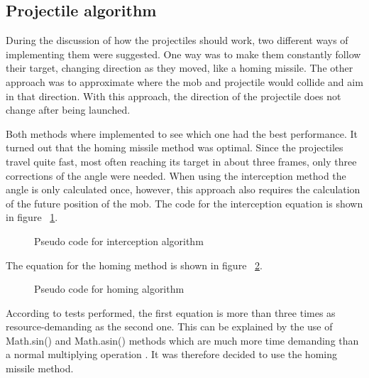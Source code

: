 \subsection{Projectile algorithm}

During the discussion of how the projectiles should work, two different ways of implementing them were suggested. One way was to make them constantly follow their target, changing direction as they moved, like a homing missile. The other approach was to approximate where the mob and projectile would collide and aim in that direction. With this approach, the direction of the projectile does not change after being launched. 

Both methods where implemented to see which one had the best performance. It turned out that the homing missile method was optimal. Since the projectiles travel quite fast, most often reaching its target in about three frames, only three corrections of the angle were needed. When using the interception method the angle is only calculated once, however, this approach also requires the calculation of the future position of the mob. The code for the interception equation is shown in figure ~\ref{fig:codeEXInterception}.

\begin{figure}[htb]

\begin{small}

\end{small}

\caption{Pseudo code for interception algorithm}
\label{fig:codeEXInterception}

\end{figure}

The equation for the homing method is shown in figure ~\ref{fig:codeEXHoming}.

\begin{figure}[htb]

\begin{small}

\end{small}

\caption{Pseudo code for homing algorithm}
\label{fig:codeEXHoming}

\end{figure}

According to tests performed, the first equation is more than three times as resource-demanding as the second one. This can be explained by the use of Math.sin() and Math.asin() methods which are much more time demanding than a normal multiplying operation \citep{Green2}. It was therefore decided to use the homing missile method.

